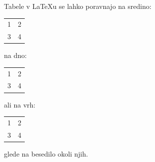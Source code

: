 \documentclass{article}
\begin{document}







Tabele v \LaTeX u se lahko poravnajo na sredino:
\begin{tabular}{ll} 1&2\\3&4 \end{tabular}
na dno:
\begin{tabular}[b]{ll} 1&2\\3&4 \end{tabular}
ali na vrh:
\begin{tabular}[t]{ll} 1&2\\3&4 \end{tabular}
glede na besedilo okoli njih.
\end{document}
